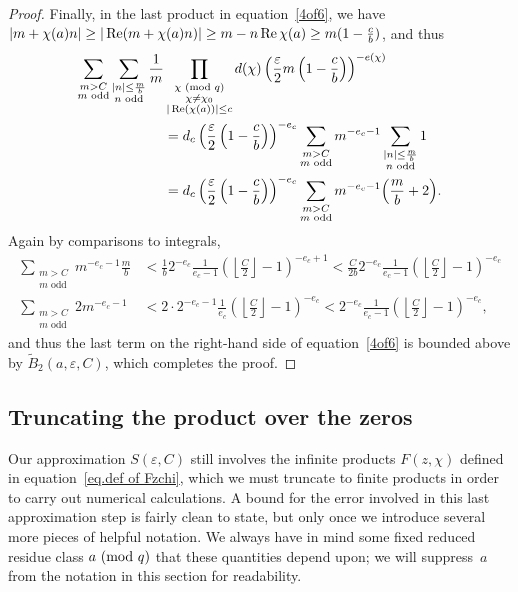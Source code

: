 \documentclass[11pt]{article}
\theoremstyle{plain}
\theoremstyle{definition}
\numberwithin{equation}{section}
\renewcommand{\mod}[1]{{\ifmmode\text{\rm\ (mod~$#1$)}\else\discretionary{}{}{\hbox{\!\!}}\rm(mod~$#1$)\fi}}
\renewcommand{\Re}{\mathop{\rm Re}}
\newcommand{\0}{{\vec 0}}
\begin{document}
\begin{proof}
Finally, in the last product in equation~\eqref{4of6}, we have $|m+\chi(a)n| \ge |\Re(m+\chi(a)n)| \ge m-n\Re\chi(a) \ge m(1-\frac{c}b)$, and thus
\begin{align*}
\sum_{\substack{m>C \\ m\text{ odd}}} \sum_{{\substack{|n| \le \frac{m}{b}\\ n\text{ odd}}}} \frac1m & \prod_{\substack{\chi \mod{q}\\ \chi\neq \chi_0 \\ |\Re(\chi(a))|\le c}} d(\chi) \left( \frac{\varepsilon}{2} m \left( 1-\frac{c}b \right) \right)^{-e(\chi)} \\
&= d_c\left(\frac{\varepsilon}{2}\left(1-\frac{c}{b}\right)\right)^{-e_c} \sum_{\substack{m>C \\ m\text{ odd}}} m^{-e_c-1} \sum_{{\substack{|n| \le \frac{m}{b}\\ n\text{ odd}}}} 1 \\
&= d_c\left(\frac{\varepsilon}{2}\left(1-\frac{c}{b}\right)\right)^{-e_c} \sum_{\substack{m>C \\ m\text{ odd}}} m^{-e_c-1} \Bigl( \frac mb+2 \Bigr).
\end{align*}
Again by comparisons to integrals,
\begin{align*}
\sum_{\substack{m>C \\ m\text{ odd}}} m^{-e_c-1} \frac mb &< \frac1b 2^{-e_c} \frac1{e_c-1} \left(\left\lfloor\frac{C}{2}\right\rfloor-1\right)^{-e_c+1}< \frac C{2b} 2^{-e_c} \frac1{e_c-1} \left(\left\lfloor\frac{C}{2}\right\rfloor-1\right)^{-e_c} \\
\sum_{\substack{m>C \\ m\text{ odd}}} 2m^{-e_c-1} &< 2 \cdot 2^{-e_c-1} \frac1{e_c} \left(\left\lfloor\frac{C}{2}\right\rfloor-1\right)^{-e_c}< 2^{-e_c} \frac1{e_c-1} \left(\left\lfloor\frac{C}{2}\right\rfloor-1\right)^{-e_c},
\end{align*}
and thus the last term on the right-hand side of equation~\eqref{4of6} is bounded above by $\widetilde{B}_2(a,\varepsilon,C)$, which completes the proof.
\end{proof}


\subsection{Truncating the product over the zeros}

Our approximation $S(\varepsilon,C)$ still involves the infinite products $F(z,\chi)$ defined in equation~\eqref{eq.def of Fzchi}, which we must truncate to finite products in order to carry out numerical calculations. A bound for the error involved in this last approximation step is fairly clean to state, but only once we introduce several more pieces of helpful notation. We always have in mind some fixed reduced residue class $a\mod q$ that these quantities depend upon; we will suppress~$a$ from the notation in this section for readability.
\end{document}
